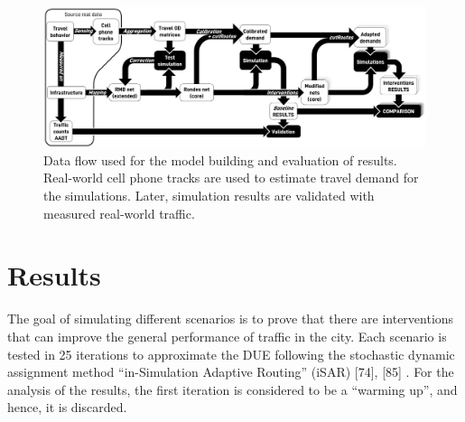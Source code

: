 \begin{figure}[htbp!]
    \centering
    \includegraphics[width=1\textwidth]{LCBM_fig06.jpg}
    \caption{Data flow used for the model building and evaluation of results. Real-world cell phone tracks are used to estimate travel demand for the simulations. Later, simulation results are validated with measured real-world traffic.}
   \label{fig:LCBM_fig06}
\end{figure}

\section{Results}
\label{sec:LCBM_3_results}

The goal of simulating different scenarios is to prove that there are interventions that can improve the general performance of traffic in the city. Each scenario is tested in 25 iterations to approximate the DUE following the stochastic dynamic assignment method “in-Simulation Adaptive Routing” (iSAR) [74], [85] \citep{ArgotaSanchez-Vaquerizo2021,GermanAerospaceCenterDLRandothers2021e}. For the analysis of the results, the first iteration is considered to be a “warming up”, and hence, it is discarded.

